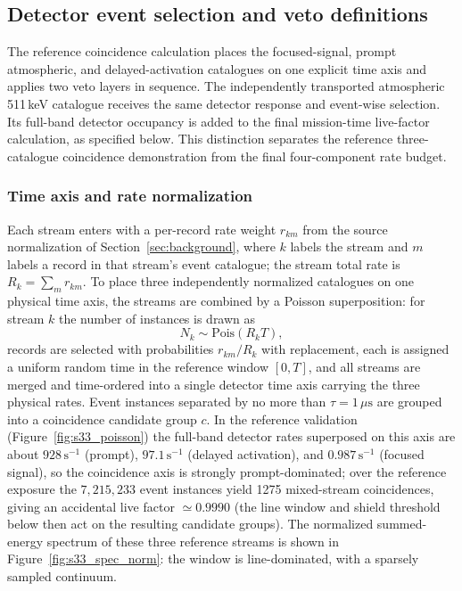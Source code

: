 \documentclass[11pt]{article}
\begin{document}
\subsection{Detector event selection and veto definitions}
\label{sec:selection}

The reference coincidence calculation places the focused-signal, prompt
atmospheric, and delayed-activation catalogues on one explicit time axis and
applies two veto layers in sequence. The independently transported atmospheric
511\,keV catalogue receives the same detector response and event-wise selection.
Its full-band detector occupancy is added to the final mission-time live-factor
calculation, as specified below. This distinction separates the reference
three-catalogue coincidence demonstration from the final four-component rate
budget.

\subsubsection{Time axis and rate normalization}

Each stream enters with a per-record rate weight $r_{km}$ from the source
normalization of Section~\ref{sec:background}, where $k$ labels the stream and
$m$ labels a record in that stream's event catalogue; the stream total rate is
$R_k=\sum_m r_{km}$. To place three independently normalized catalogues on one
physical time axis, the streams are combined by a Poisson superposition: for
stream $k$ the number of instances is drawn as
\begin{equation}
  N_k\sim \mathrm{Pois}(R_k T),
\end{equation}
records are selected with probabilities $r_{km}/R_k$ with replacement, each is
assigned a uniform random time in the reference window $[0,T]$, and all streams
are merged and time-ordered into a single detector time axis carrying the three
physical rates. Event instances separated by no more than $\tau=1\,\mu\mathrm{s}$
are grouped into a coincidence candidate group $c$. In the reference validation (Figure~\ref{fig:s33_poisson}) the full-band detector rates superposed on this axis are about $928\,\mathrm{s^{-1}}$ (prompt), $97.1\,\mathrm{s^{-1}}$ (delayed activation), and $0.987\,\mathrm{s^{-1}}$ (focused signal), so the coincidence axis is strongly prompt-dominated; over the reference exposure the $7{,}215{,}233$ event instances yield 1275 mixed-stream coincidences, giving an accidental live factor $\simeq0.9990$ (the line window and shield threshold below then act on the resulting candidate groups). The normalized summed-energy spectrum of these three reference streams is shown in Figure~\ref{fig:s33_spec_norm}: the window is line-dominated, with a sparsely sampled continuum.
\end{document}
